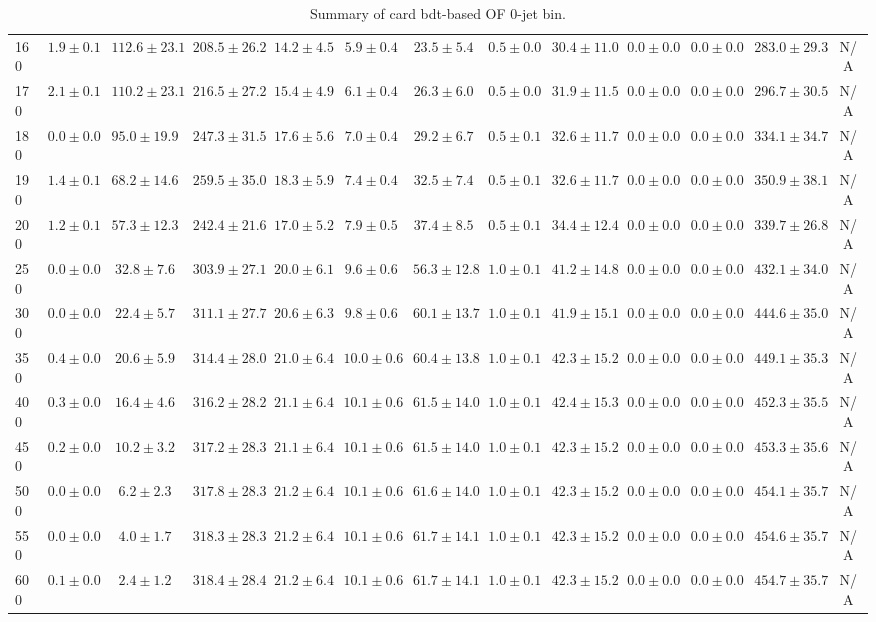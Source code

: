 \begin{table}
{\begin{center}
\begin{tabular}{l | c c | c c c c c c c c  | c c}
160 & $1.9\pm0.1$ & $112.6\pm23.1$ & $208.5\pm26.2$ & $14.2\pm4.5$ & $5.9\pm0.4$ & $23.5\pm5.4$ & $0.5\pm0.0$ & $30.4\pm11.0$ & $0.0\pm0.0$ & $0.0\pm0.0$ & $283.0\pm29.3$ & N/A \\
170 & $2.1\pm0.1$ & $110.2\pm23.1$ & $216.5\pm27.2$ & $15.4\pm4.9$ & $6.1\pm0.4$ & $26.3\pm6.0$ & $0.5\pm0.0$ & $31.9\pm11.5$ & $0.0\pm0.0$ & $0.0\pm0.0$ & $296.7\pm30.5$ & N/A \\
180 & $0.0\pm0.0$ & $95.0\pm19.9$ & $247.3\pm31.5$ & $17.6\pm5.6$ & $7.0\pm0.4$ & $29.2\pm6.7$ & $0.5\pm0.1$ & $32.6\pm11.7$ & $0.0\pm0.0$ & $0.0\pm0.0$ & $334.1\pm34.7$ & N/A \\
190 & $1.4\pm0.1$ & $68.2\pm14.6$ & $259.5\pm35.0$ & $18.3\pm5.9$ & $7.4\pm0.4$ & $32.5\pm7.4$ & $0.5\pm0.1$ & $32.6\pm11.7$ & $0.0\pm0.0$ & $0.0\pm0.0$ & $350.9\pm38.1$ & N/A \\
200 & $1.2\pm0.1$ & $57.3\pm12.3$ & $242.4\pm21.6$ & $17.0\pm5.2$ & $7.9\pm0.5$ & $37.4\pm8.5$ & $0.5\pm0.1$ & $34.4\pm12.4$ & $0.0\pm0.0$ & $0.0\pm0.0$ & $339.7\pm26.8$ & N/A \\
250 & $0.0\pm0.0$ & $32.8\pm7.6$ & $303.9\pm27.1$ & $20.0\pm6.1$ & $9.6\pm0.6$ & $56.3\pm12.8$ & $1.0\pm0.1$ & $41.2\pm14.8$ & $0.0\pm0.0$ & $0.0\pm0.0$ & $432.1\pm34.0$ & N/A \\
300 & $0.0\pm0.0$ & $22.4\pm5.7$ & $311.1\pm27.7$ & $20.6\pm6.3$ & $9.8\pm0.6$ & $60.1\pm13.7$ & $1.0\pm0.1$ & $41.9\pm15.1$ & $0.0\pm0.0$ & $0.0\pm0.0$ & $444.6\pm35.0$ & N/A \\
350 & $0.4\pm0.0$ & $20.6\pm5.9$ & $314.4\pm28.0$ & $21.0\pm6.4$ & $10.0\pm0.6$ & $60.4\pm13.8$ & $1.0\pm0.1$ & $42.3\pm15.2$ & $0.0\pm0.0$ & $0.0\pm0.0$ & $449.1\pm35.3$ & N/A \\
400 & $0.3\pm0.0$ & $16.4\pm4.6$ & $316.2\pm28.2$ & $21.1\pm6.4$ & $10.1\pm0.6$ & $61.5\pm14.0$ & $1.0\pm0.1$ & $42.4\pm15.3$ & $0.0\pm0.0$ & $0.0\pm0.0$ & $452.3\pm35.5$ & N/A \\
450 & $0.2\pm0.0$ & $10.2\pm3.2$ & $317.2\pm28.3$ & $21.1\pm6.4$ & $10.1\pm0.6$ & $61.5\pm14.0$ & $1.0\pm0.1$ & $42.3\pm15.2$ & $0.0\pm0.0$ & $0.0\pm0.0$ & $453.3\pm35.6$ & N/A \\
500 & $0.0\pm0.0$ & $6.2\pm2.3$ & $317.8\pm28.3$ & $21.2\pm6.4$ & $10.1\pm0.6$ & $61.6\pm14.0$ & $1.0\pm0.1$ & $42.3\pm15.2$ & $0.0\pm0.0$ & $0.0\pm0.0$ & $454.1\pm35.7$ & N/A \\
550 & $0.0\pm0.0$ & $4.0\pm1.7$ & $318.3\pm28.3$ & $21.2\pm6.4$ & $10.1\pm0.6$ & $61.7\pm14.1$ & $1.0\pm0.1$ & $42.3\pm15.2$ & $0.0\pm0.0$ & $0.0\pm0.0$ & $454.6\pm35.7$ & N/A \\
600 & $0.1\pm0.0$ & $2.4\pm1.2$ & $318.4\pm28.4$ & $21.2\pm6.4$ & $10.1\pm0.6$ & $61.7\pm14.1$ & $1.0\pm0.1$ & $42.3\pm15.2$ & $0.0\pm0.0$ & $0.0\pm0.0$ & $454.7\pm35.7$ & N/A \\
\hline
\end{tabular}
\end{center}
}
\caption{Summary of card bdt-based OF 0-jet bin.}
\end{table}
